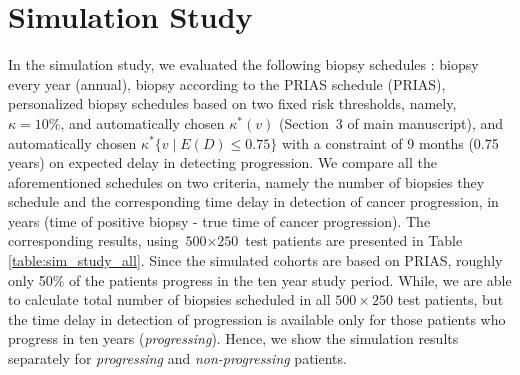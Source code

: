 \section{Simulation Study}
In the simulation study, we evaluated the following biopsy schedules \citep{loeb2014heterogeneity, inoue2018comparative}: biopsy every year (annual), biopsy according to the PRIAS schedule (PRIAS), personalized biopsy schedules based on two fixed risk thresholds, namely, $\kappa=10\%$, and automatically chosen $\kappa^*(v)$ (Section~3 of main manuscript), and automatically chosen ${\kappa^*\{v \mid E(D)\leq 0.75\}}$ with a constraint of 9 months (0.75 years) on expected delay in detecting progression. We compare all the aforementioned schedules on two criteria, namely the number of biopsies they schedule and the corresponding time delay in detection of cancer progression, in years (time of positive biopsy - true time of cancer progression). The corresponding results, using ${\mbox{500} \times \mbox{250}}$ test patients are presented in Table \ref{table:sim_study_all}. Since the simulated cohorts are based on PRIAS, roughly only 50\% of the patients progress in the ten year study period. While, we are able to calculate total number of biopsies scheduled in all $500 \times 250$ test patients, but the time delay in detection of progression is available only for those patients who progress in ten years (\textit{progressing}). Hence, we show the simulation results separately for \textit{progressing} and \textit{non-progressing} patients.

